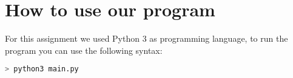 \section{How to use our program}

For this assignment we used Python 3 as programming language, to run the program you can use the following syntax:

\begin{lstlisting}[language=bash]
> python3 main.py
\end{lstlisting}

